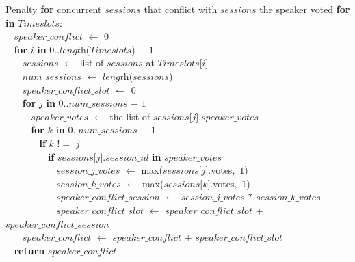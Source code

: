 \begin{tabbing}Penalty {\bf for} concurrent $\textit{sessions}$ that conflict with $\textit{sessions}$ the speaker voted {\bf for} {\bf in} $\textit{Timeslots}$$:$\\
$~~~~$$\textit{speaker\_conflict}$ $\leftarrow$ $0$\\
$~~~~${\bf for} $\textit{i}$ {\bf in} $0..$$\textit{length}$($\textit{Timeslots}$) $-$ $1$\\
$~~~~~~~~$$\textit{sessions}$ $\leftarrow$ list of $\textit{sessions}$ at $\textit{Timeslots}$$[$$\textit{i}$$]$\\
$~~~~~~~~$$\textit{num\_sessions}$ $\leftarrow$ $\textit{length}$($\textit{sessions}$)\\
$~~~~~~~~$$\textit{speaker\_conflict\_slot}$ $\leftarrow$ $0$\\
$~~~~~~~~${\bf for} $\textit{j}$ {\bf in} $0..$$\textit{num\_sessions}$ $-$ $1$\\
$~~~~~~~~~~~~$$\textit{speaker\_votes}$ $\leftarrow$ the list of $\textit{sessions}$$[$$\textit{j}$$].$$\textit{speaker\_votes}$\\
$~~~~~~~~~~~~${\bf for} $\textit{k}$ {\bf in} $0..$$\textit{num\_sessions}$ $-$ $1$\\
$~~~~~~~~~~~~~~~~${\bf if} $\textit{k}$ $!=$ $\textit{j}$\\
$~~~~~~~~~~~~~~~~~~~~${\bf if} $\textit{sessions}$$[$$\textit{j}$$].$$\textit{session\_id}$ {\bf in} $\textit{speaker\_votes}$\\
$~~~~~~~~~~~~~~~~~~~~~~~~$$\textit{session\_j\_votes}$ $\leftarrow$ max($\textit{sessions}$$[$$\textit{j}$$].$votes$,$ $1$)\\
$~~~~~~~~~~~~~~~~~~~~~~~~$$\textit{session\_k\_votes}$ $\leftarrow$ max($\textit{sessions}$$[$$\textit{k}$$].$votes$,$ $1$)\\
$~~~~~~~~~~~~~~~~~~~~~~~~$$\textit{speaker\_conflict\_session}$ $\leftarrow$ $\textit{session\_j\_votes}$ $*$ $\textit{session\_k\_votes}$\\
$~~~~~~~~~~~~~~~~~~~~~~~~$$\textit{speaker\_conflict\_slot}$ $\leftarrow$ $\textit{speaker\_conflict\_slot}$ $+$ $\textit{speaker\_conflict\_session}$\\
$~~~~~~~~$$\textit{speaker\_conflict}$ $\leftarrow$ $\textit{speaker\_conflict}$ $+$ $\textit{speaker\_conflict\_slot}$\\
$~~~~${\bf return} $\textit{speaker\_conflict}$\\
\end{tabbing}